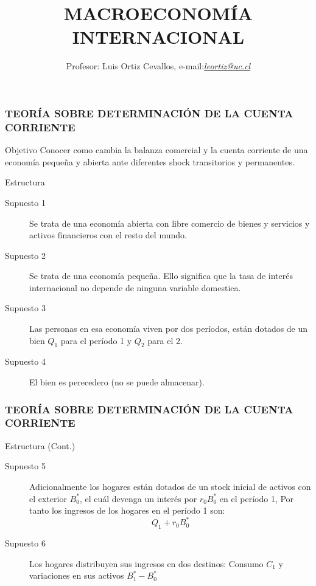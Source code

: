 \documentclass[10pt, xcolor=table, x11names]{beamer}
\author[Luis Ortiz Cevallos e-mail: \href{leortiz@uc.cl}{\textit{leortiz@uc.cl}}]{Profesor: Luis Ortiz Cevallos, e-mail:\href{leortiz@uc.cl}{\textit{leortiz@uc.cl}} }
\title[MACRO INTERNACIONAL]{\vspace*{1.0em} MACROECONOMÍA INTERNACIONAL}
\date[\href{https://ortiz-cevallos.github.io/luisortiz.github.io/ }{\textit{https://ortiz-cevallos.github.io/luisortiz.github.io/}}]{}
\begin{document}
\begin{frame}
\titlepage
\end{frame}


\begin{frame}[label=1]
	\frametitle{{\normalsize TEORÍA SOBRE DETERMINACIÓN DE LA CUENTA CORRIENTE} {}}
	\begin{block} {Objetivo}
	Conocer como cambia la balanza comercial y la cuenta corriente de una economía pequeña y abierta ante diferentes shock transitorios y permanentes. 	
	\end{block}	
	\begin{block} {Estructura}
		\begin{description}
			\item[Supuesto 1] Se trata de una economía abierta con libre comercio de bienes y servicios y activos financieros con el resto del mundo.
			\item[Supuesto 2] Se trata de una economía pequeña. Ello significa que la tasa de interés internacional no depende de ninguna variable domestica.
			\item[Supuesto 3] Las personas en esa economía viven por dos períodos, están dotados de un bien $Q_{1} $ para el período 1 y $Q_{2} $ para el 2. 	
			\item[Supuesto 4] El bien es perecedero (no se puede almacenar).
		\end{description}
	\end{block}	
\end{frame}

\begin{frame}[label=2]
	\frametitle{{\normalsize TEORÍA SOBRE DETERMINACIÓN DE LA CUENTA CORRIENTE} {}}
	\begin{block} {Estructura (Cont.)}
		\begin{description}
			\item[Supuesto 5] Adicionalmente los hogares están dotados de un stock inicial de activos con el exterior $B_{0}^{*} $, el cuál devenga un interés por $r_{0}B_{0}^{*} $ en el período 1, Por tanto los ingresos de los hogares en el período 1 son:
			\begin{equation}
			Q_{1}+r_{0}B_{0}^{*}\nonumber
			\end{equation}
			\item[Supuesto 6] Los hogares distribuyen sus ingresos en dos destinos: Consumo $ C_{1}$ y variaciones en sus activos $ B_{1}^{*}-B_{0}^{*}$
		\end{description}
	\end{block}	
	
	
\end{frame}
\end{document}
